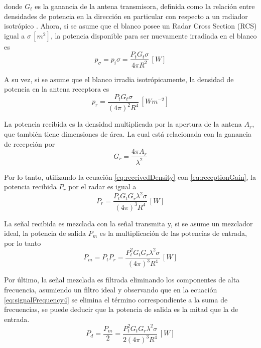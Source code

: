 donde $G_t$ es la ganancia de la antena transmisora, definida como la relación entre densidades de potencia en la dirección en particular con respecto a un radiador isotrópico \cite{Richards2009}. Ahora, si se asume que el blanco posee un Radar Cross Section (RCS) igual a $\sigma \,[\si{m^2}]$, la potencia disponible para ser nuevamente irradiada en el blanco es 
\begin{equation}
  p_\sigma = p_i\sigma = \dfrac{P_tG_t\sigma}{4\pi R^2} \,[\si{W}]
\end{equation}

A su vez, si se asume que el blanco irradia isotrópicamente, la densidad de potencia en la antena receptora es 
\begin{equation} \label{eq:receivedDensity}
  p_r = \dfrac{P_tG_t\sigma}{(4\pi)^2 R^4} \,[\si{Wm^{-2}}]
\end{equation}

La potencia recibida es la densidad multiplicada por la apertura de la antena $A_r$, que también tiene dimensiones de área. La cual está relacionada con la ganancia de recepción por 
\begin{equation} \label{eq:receptionGain}
  G_r = \dfrac{4\pi A_r}{\lambda^2}
\end{equation}

Por lo tanto, utilizando la ecuación \ref{eq:receivedDensity} con \ref{eq:receptionGain}, la potencia recibida $P_r$ por el radar es igual a
\begin{equation}
  P_r = \dfrac{P_tG_tG_r\lambda^2\sigma}{(4\pi)^3 R^4} \,[\si{W}]
\end{equation}

La señal recibida es mezclada con la señal transmita y, si se asume un mezclador ideal, la potencia de salida $P_m$ es la multiplicación de las potencias de entrada, por lo tanto
\begin{equation}
  P_m = P_tP_r = \dfrac{P_t^2G_tG_r\lambda^2\sigma}{(4\pi)^3 R^4} \,[\si{W}]
\end{equation}

Por último, la señal mezclada es filtrada eliminando los componentes de alta frecuencia, asumiendo un filtro ideal y observando que en la ecuación \ref{eq:signalFrequency4} se elimina el término correspondiente a la suma de frecuencias, se puede deducir que la potencia de salida es la mitad que la de entrada.
\begin{equation} \label{eq:derampedPower}
  P_d = \dfrac{P_m}{2} = \dfrac{P_t^2G_tG_r\lambda^2\sigma}{2(4\pi)^3 R^4} \,[\si{W}]
\end{equation}

